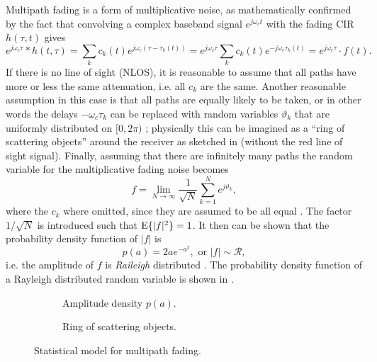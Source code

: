 Multipath fading is a form of multiplicative noise, as mathematically confirmed by the fact that convolving a complex baseband signal \(e^{j\omega_c t}\) with the fading CIR \(h(\tau, t)\) gives
\begin{equation}
	e^{j\omega_c \tau} * h(t, \tau) = \sum_k c_k(t) e^{j\omega_c(\tau - \tau_k(t))}
	= e^{j\omega_c \tau} \sum_k c_k(t) e^{-j\omega_c \tau_k(t)}
	= e^{j\omega_c \tau} \cdot f(t).
\end{equation}
If there is no line of sight (NLOS), it is reasonable to assume that all paths have more or less the same attenuation, i.e. all \(c_k\) are the same. Another reasonable assumption in this case is that all paths are equally likely to be taken, or in other words the delays \(-\omega_c \tau_k\) can be replaced with random variables \(\vartheta_k\) that are uniformly distributed on \([0,2\pi)\) \cite{Hoher2013,Mathis}; physically this can be imagined as a ``ring of scattering objects'' around the receiver \cite{Messier} as sketched in  (without the red line of sight signal). Finally, assuming that there are infinitely many paths the random variable for the multiplicative fading noise becomes
\begin{equation} \label{eqn:mult-fading-nlos}
	f = \lim_{N\rightarrow\infty} \frac{1}{\sqrt{N}}
		\sum_{k=1}^{N} e^{j \vartheta_k },
\end{equation}
where the \(c_k\) where omitted, since they are assumed to be all equal \cite{Hoher2013}. The factor \(1/\sqrt{N}\) is introduced such that \(\operatorname{E} \{|f|^2\} = 1\). It then can be shown that the probability density function of \(|f|\) is
\begin{equation}
	p(a)= 2a e^{-a^2}, \text{ or } |f| \sim \mathcal{R},
\end{equation}
i.e. the amplitude of \(f\) is \emph{Raileigh} distributed \cite{Hoher2013}. The probability density function of a Rayleigh distributed random variable is shown in .

\begin{figure}
	\centering
	\hfill
	\begin{subfigure}[t]{.5\linewidth}
		
		\caption{
			Amplitude density \(p(a)\).
			\label{fig:rayleigh-rice-pdf}
		}
	\end{subfigure}
	\hfill
	\begin{subfigure}[t]{.45\linewidth}
		\centering
		\resizebox{!}{5cm}{%
			
		}
		\caption{
			Ring of scattering objects.
			\label{fig:ring-of-scattering-objects}
		}
	\end{subfigure}
	\hfill
	\caption{
		Statistical model for multipath fading.
		\label{fig:multipath-statistical-models}
	}
\end{figure}

